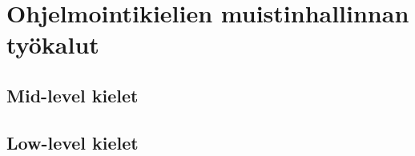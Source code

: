 \chapter{Ohjelmointikielien muistinhallinnan työkalut} \label{Kolmas luku}

\section{Mid-level kielet}

\section{Low-level kielet}